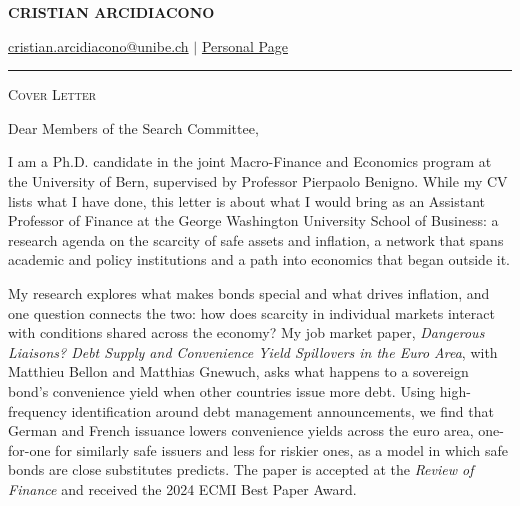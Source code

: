 \documentclass[11pt]{article}
\begin{document}
 
\begin{center}
    \textbf{\large \scshape CRISTIAN ARCIDIACONO}
\end{center}

\begin{center}
    {\href{mailto:cristian.arcidiacono@unibe.ch}{cristian.arcidiacono@unibe.ch} $\vert$ \href{https://sites.google.com/view/cristian-arcidiacono/home}{Personal Page}}
\end{center}
\vspace{-0.2cm}
\noindent\rule{\textwidth}{0.4pt}

\vspace{0.2cm}

\begin{center}
    {\large \scshape Cover Letter}
\end{center}

\vspace{0.3cm}

Dear Members of the Search Committee,

I am a Ph.D. candidate in the joint Macro-Finance and Economics program at the University of Bern, supervised by Professor Pierpaolo Benigno. While my CV lists what I have done, this letter is about what I would bring as an Assistant Professor of Finance at the George Washington University School of Business: a research agenda on the scarcity of safe assets and inflation, a network that spans academic and policy institutions and a path into economics that began outside it.

My research explores what makes bonds special and what drives inflation, and one question connects the two: how does scarcity in individual markets interact with conditions shared across the economy? My job market paper, \textit{Dangerous Liaisons? Debt Supply and Convenience Yield Spillovers in the Euro Area}, with Matthieu Bellon and Matthias Gnewuch, asks what happens to a sovereign bond's convenience yield when other countries issue more debt. Using high-frequency identification around debt management announcements, we find that German and French issuance lowers convenience yields across the euro area, one-for-one for similarly safe issuers and less for riskier ones, as a model in which safe bonds are close substitutes predicts. The paper is accepted at the \textit{Review of Finance} and received the 2024 ECMI Best Paper Award.
\end{document}
